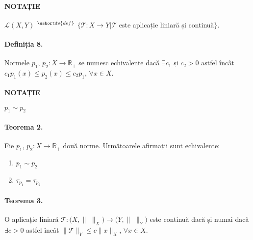 \paragraph{NOTAȚIE}
$\mathcal{L}(X, Y)$ $^{\ushortdw{def}}$ $\{\mathcal{T}:X \rightarrow Y \vert \mathcal{T}$ este aplicație liniară și continuă$\}$.

\paragraph{Definiția 8.}
Normele $p_{1}$, $p_{2}:X \rightarrow \mathbb{R}_{+}$ se numesc echivalente dacă $\exists c_{1}$ și $c_{2} > 0$ astfel încât \\
$c_{1}p_{1}(x) \leq p_{2}(x) \leq c_{2}p_{1}$, $\forall x \in X$.

\paragraph{NOTAȚIE}
$p_{1} \sim p_{2}$

\paragraph{Teorema 2.}
Fie $p_{1}$, $p_{2}:X \rightarrow \mathbb{R}_{+}$ două norme. Următoarele afirmații sunt echivalente:
\begin{enumerate}[label=\emph{\alph*})]
	\item $p_{1} \sim p_{2}$
	\item $\tau_{p_{1}} = \tau_{p_{2}}$
\end{enumerate}

\paragraph{Teorema 3.}
O aplicație liniară $\mathcal{T}:(X, \lVert$ $\rVert_{X}) \rightarrow (Y, \lVert$ $\rVert_{Y})$ este continuă dacă și numai dacă $\exists c>0$ astfel încât
$\lVert \mathcal{T} \rVert_{Y} \leq c \lVert x \rVert_{X}$, $\forall x \in X$.

